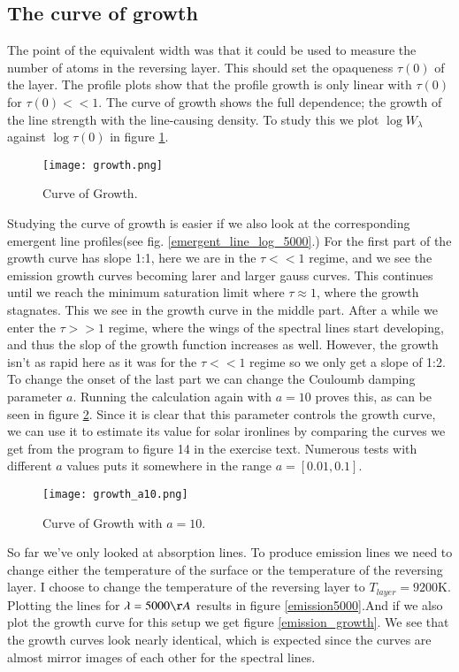 \documentclass{aa}   %
\begin{document}
\subsection{The curve of growth}
The point of the equivalent width was that it could be used to measure the number of atoms in the reversing layer. This should set the opaqueness $\tau(0)$ of the layer. The profile plots show that the profile growth is only linear with $\tau(0)$ for $\tau(0) <<1$. The curve of growth shows the full dependence; the growth of the line strength with the line-causing density.
To study this we plot $\log W_\lambda$ against $\log \tau(0)$ in figure \ref{growth}.
\begin{figure}
 \texttt{[image: growth.png]}
 \caption{Curve of Growth.}
 \label{growth} 
\end{figure}
Studying the curve of growth is easier if we also look at the corresponding emergent line profiles(see fig. \ref{emergent_line_log_5000}.) For the first part of the growth curve has slope 1:1, here we are in the $\tau << 1$ regime, and we see the emission growth curves becoming larer and larger gauss curves. This continues until we reach the minimum saturation limit where $\tau \approx 1$, where the growth stagnates. This we see in the growth curve in the middle part. After a while we enter the $\tau >> 1$ regime, where the wings of the spectral lines start developing, and thus the slop of the growth function increases as well. However, the growth isn't as rapid here as it was for the $\tau << 1$ regime so we only get a slope of 1:2.
To change the onset of the last part we can change the Couloumb damping parameter $a$. Running the calculation again with $a = 10$ proves this, as can be seen in figure \ref{growth_a10}. Since it is clear that this parameter controls the growth curve, we can use it to estimate its value for solar ironlines by comparing the curves we get from the program to figure 14 in the exercise text. Numerous tests with different $a$ values puts it somewhere in the range $a = [0.01, 0.1]$.
\begin{figure}
 \texttt{[image: growth\_a10.png]}
 \caption{Curve of Growth with $a = 10$.}
 \label{growth_a10} 
\end{figure}
So far we've only looked at absorption lines. To produce emission lines we need to change either the temperature of the surface or the temperature of the reversing layer. I choose to change the temperature of the reversing layer to $T_{layer} = 9200$K. Plotting the lines for $\lambda = 5000 \AA$ results in figure \ref{emission5000}.And if we also plot the growth curve for this setup we get figure \ref{emission_growth}. We see that the growth curves look nearly identical, which is expected since the curves are almost mirror images of each other for the spectral lines.
\end{document}
